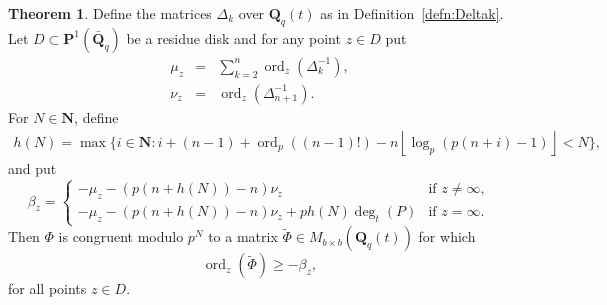 \documentclass[a4paper,11pt]{article}
\numberwithin{equation}{section}
\providecommand{\floor}[1]{\left\lfloor#1\right\rfloor}   %
\newcommand{\NN}{\mathbf{N}} %
\newcommand{\QQ}{\mathbf{Q}} %
\DeclareMathOperator{\ord}{ord}          %
\theoremstyle{definition}
\newtheorem{thm}{Theorem}[section]
\begin{document}
\begin{thm} \label{thm:Gerkmann}
Define the matrices $\Delta_k$ over $\QQ_q(t)$ as in 
Definition~\ref{defn:Deltak}.
Let $D \subset \mathbf{P}^1(\bar{\QQ}_q)$ be a residue disk
and for any point $z \in D$ put
\begin{eqnarray*}
\mu_z &=& \sum_{k=2}^n \ord_z(\Delta_k^{-1}), \\
\nu_z &=& \ord_z(\Delta_{n+1}^{-1}).
\end{eqnarray*}
For $N \in \NN$, define 
\begin{align*}
h(N) = \max \{ i \in \NN : i+(n-1)+\ord_p ((n-1)!)-n \floor{\log_p(p(n+i)-1)} < N \},
\end{align*}
and put
\[
\beta_z = \begin{cases}
-\mu_z -(p(n+h(N))-n) \nu_z & \mbox{if $z \neq \infty$}, \\
-\mu_z -(p(n+h(N))-n) \nu_z + p h(N) \deg_t(P) & \mbox{if $z = \infty$}.
\end{cases}
\]
Then $\Phi$ is congruent modulo $p^N$ to a matrix 
$\tilde{\Phi} \in M_{b \times b}(\QQ_q(t))$ for which
\begin{equation*}
\ord_z(\tilde{\Phi}) \geq -\beta_z,
\end{equation*}
for all points $z \in D$.
\end{thm}
\end{document}
